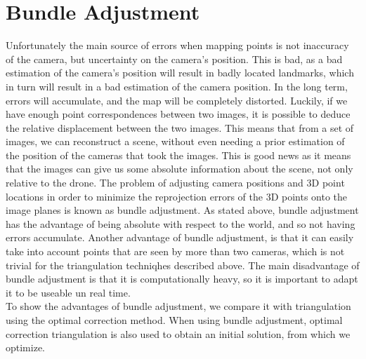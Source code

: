 \section{Bundle Adjustment}
Unfortunately the main source of errors when mapping points is not inaccuracy of the camera, but uncertainty on the camera's position. This is bad, as a bad estimation of the camera's position will result in badly located landmarks, which in turn will result in a bad estimation of the camera position. In the long term, errors will accumulate, and the map will be completely distorted. Luckily, if we have enough point correspondences between two images, it is possible to deduce the relative displacement between the two images. This means that from a set of images, we can reconstruct a scene, without even needing a prior estimation of the position of the cameras that took the images. This is good news as it means that the images can give us some absolute information about the scene, not only relative to the drone. The problem of adjusting camera positions and 3D point locations in order to minimize the reprojection errors of the 3D points onto the image planes is known as bundle adjustment. As stated above, bundle adjustment has the advantage of being absolute with respect to the world, and so not having errors accumulate. Another advantage of bundle adjustment, is that it can easily take into account points that are seen by more than two cameras, which is not trivial for the triangulation techniqhes described above. The main disadvantage of bundle adjustment is that it is computationally heavy, so it is important to adapt it to be useable un real time.\\
To show the advantages of bundle adjustment, we compare it with triangulation using the optimal correction method. When using bundle adjustment, optimal correction triangulation is also used to obtain an initial solution, from which we optimize.


